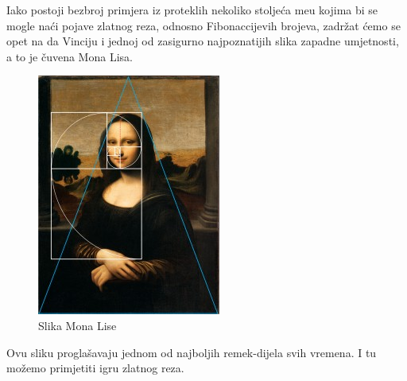 \documentclass[14pt]{scrartcl}
\begin{document}
Iako postoji bezbroj primjera iz proteklih nekoliko stolje\'{c}a me\dj{}u kojima bi se mogle na\'{c}i pojave zlatnog reza, odnosno Fibonaccijevih brojeva, zadr\v{z}at \'{c}emo se opet na da Vinciju i jednoj od zasigurno najpoznatijih slika zapadne umjetnosti, a to je \v{c}uvena Mona Lisa.\\
\begin{figure}[hb!]
\begin{center}
\includegraphics[scale=0.7]{MonaLisa.jpg}
\end{center}
\caption{Slika Mona Lise}
\label{fig:mona}
\end{figure}

Ovu sliku progla\v{s}avaju jednom od najboljih remek-dijela svih vremena. I tu mo\v{z}emo primjetiti igru zlatnog reza.\\
\end{document}

